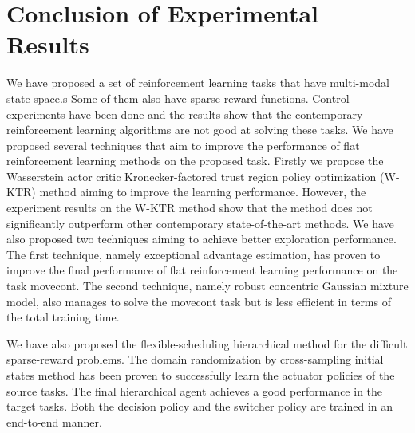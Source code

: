 \section{Conclusion of Experimental Results}
We have proposed a set of reinforcement learning tasks that have multi-modal state space.s Some of them also have sparse reward functions. Control experiments have been done and the results show that the contemporary reinforcement learning algorithms are not good at solving these tasks.
We have proposed several techniques that aim to improve the performance of flat reinforcement learning methods on the proposed task. Firstly we propose the Wasserstein actor critic Kronecker-factored trust region policy optimization (W-KTR) method aiming to improve the learning performance. However, the experiment results on the W-KTR method show that the method does not significantly outperform other contemporary state-of-the-art methods. We have also proposed two techniques aiming to achieve better exploration performance. The first technique, namely exceptional advantage estimation, has proven to improve the final performance of flat reinforcement learning performance on the task movecont. The second technique, namely robust concentric Gaussian mixture model, also manages to solve the movecont task but is less efficient in terms of the total training time. 


We have also proposed the flexible-scheduling hierarchical method for the difficult sparse-reward problems. The domain randomization by cross-sampling initial states method has been proven to successfully learn the actuator policies of the source tasks. The final hierarchical agent achieves a good performance in the target tasks. Both the decision policy and the switcher policy are trained in an end-to-end manner. 